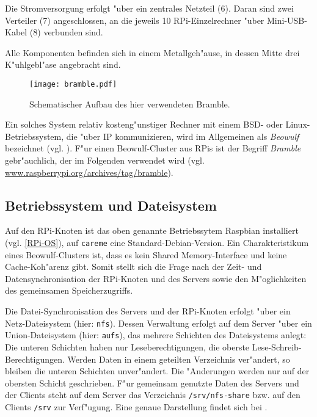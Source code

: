 Die Stromversorgung erfolgt "uber ein zentrales Netzteil (6). Daran sind zwei Verteiler (7) angeschlossen, an die jeweils 10 RPi-Einzelrechner "uber Mini-USB-Kabel (8) verbunden sind. 

Alle Komponenten befinden sich in einem Metallgeh"ause, in dessen Mitte drei K"uhlgebl"ase angebracht sind. 
\begin{figure}[htb]
	\centering
	\texttt{[image: bramble.pdf]}\\ 
	\caption{Schematischer Aufbau des hier verwendeten Bramble.}\label{fig:Bramble}
\end{figure}
Ein solches System relativ kosteng"unstiger Rechner mit einem BSD- oder Linux-Betriebs\-system, die "uber IP kommunizieren, wird im Allgemeinen als \textit{Beowulf} bezeichnet (vgl. \cite{kie01}). F"ur einen Beowulf-Cluster aus RPis ist der Begriff \textit{Bramble} gebr"auchlich, der im Folgenden verwendet wird (vgl. \url{www.raspberrypi.org/archives/tag/bramble}). 
 
\subsection{Betriebssystem und Dateisystem}\label{Bramble-Architektur} 

Auf den RPi-Knoten ist das oben genannte Betriebssytem Raspbian installiert (vgl. \ref{RPi-OS}), auf \texttt{careme} eine Standard-Debian-Version. Ein Charakteristikum eines Beowulf-Clusters ist, dass es kein Shared Memory-Interface und keine Cache-Koh"arenz gibt. Somit stellt sich die Frage nach der Zeit- und Datensynchronisation der RPi-Knoten und des Servers sowie den M"oglichkeiten des gemeinsamen Speicherzugriffs. 

Die Datei-Synchronisation des Servers und der RPi-Knoten erfolgt "uber ein Netz-Dateisys\-tem (hier: \texttt{nfs}). Dessen Verwaltung erfolgt auf dem Server "uber ein Union-Dateisystem (hier: \texttt{aufs}), das mehrere Schichten des Dateisystems anlegt: Die unteren Schichten haben nur Leseberechtigungen, die oberste Lese-Schreib-Berechtigungen. Werden Daten in einem geteilten Verzeichnis ver"andert, so bleiben die unteren Schichten unver"andert. Die "Anderungen werden nur auf der obersten Schicht geschrieben. F"ur gemeinsam genutzte Daten des Servers und der Clients steht auf dem Server das Verzeichnis \texttt{/srv/nfs-share} bzw. auf den Clients \texttt{/srv} zur Verf"ugung. Eine genaue Darstellung findet sich bei \cite{kli13}.

